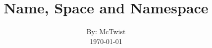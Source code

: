 

\def\writer{McTwist}

\title{Name, Space and Namespace}
\author{By: \writer\\
	\today}



\maketitle

\newpage
\tableofcontents

\newpage
{}







%


